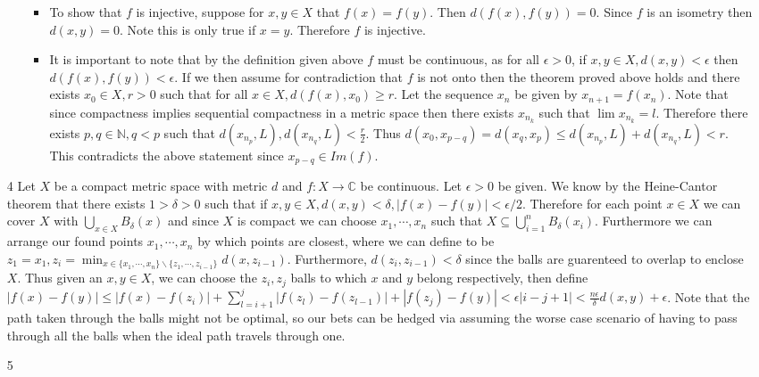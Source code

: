 \documentclass[12pt, letterpaper]{article}
\newcommand{\N}{\mathbb{N}}
\newcommand{\C}{\mathbb{C}}
\begin{document}
\begin{enumerate}
\begin{enumerate}
\begin{itemize}
			\item To show that $f$ is injective, suppose for $x,y \in X$ that 
			$f(x) = f(y)$.  Then $d(f(x),f(y)) = 0$.  Since $f$ is an isometry then
			$d(x,y) = 0$.  Note this is only true if $x = y$.  Therefore $f$ is 
			injective.
			\item It is important to note that by the definition given above $f$ must be 
			continuous, as for all $\epsilon > 0$, if $x,y \in X, d(x,y) < \epsilon$ 
			then $d(f(x),f(y)) < \epsilon$.  If we then assume for contradiction that 
			$f$ is not onto then the theorem proved above holds and there exists 
			$x_0 \in X, r > 0$ such that for all $x \in X, d(f(x), x_0) \geq r$.  Let the 
			sequence $x_n$ be given by $x_{n+1} = f(x_n)$.  Note that since compactness
			implies sequential compactness in a metric space then there exists $x_{n_k}$ 
			such that $\lim x_{n_k} = l$.  Therefore there exists $p,q\in \N, q < p$ such that 
			$d(x_{n_p}, L), d(x_{n_q}, L) < \frac{r}{2}$.  Thus $d(x_0, x_{p - q}) = d(x_q, x_p) \leq d(x_{n_p}, L) + d(x_{n_q}, L) < r$.  This contradicts the above statement since
			$x_{p-q} \in Im(f)$.  
		\end{itemize}
	\end{enumerate}
	\item[4] Let $X$ be a compact metric space with metric $d$ and $f: X \to \C$ be continuous. Let $\epsilon > 0$ be given. We know by the Heine-Cantor theorem that there exists $1 > \delta > 0$ such that if $x,y \in X, d(x,y) < \delta, |f(x) - f(y)| < \epsilon/2$.
	Therefore for each point $x \in X$ we can cover $X$ with $\bigcup_{x \in X} B_\delta(x)$
	and since $X$ is compact we can choose $x_1,\cdots,x_n$ such that $X \subseteq \bigcup_{i = 1}^n B_\delta(x_i)$.  Furthermore we can arrange our found points $x_1,\cdots, x_n$ by which points are closest, where we can define to be  $z_1 = x_1, z_i = \min_{x \in \{x_1,\cdots,x_n\}\backslash \{z_1,\cdots, z_{i-1}\}} d(x, z_{i-1})$.  Furthermore, $d(z_i,z_{i-1}) < \delta$ since the balls are guarenteed to overlap to enclose $X$.  Thus 
	given an $x,y \in X$, we can choose the $z_i, z_j$ balls to which $x$ and $y$ belong respectively, then define $|f(x) - f(y)| \leq |f(x) - f(z_i)| + \sum_{l = i + 1}^{j} |f(z_l) - f(z_{l-1})| + |f(z_j) - f(y)| < \epsilon |i - j + 1| < \frac{n\epsilon}{\delta}d(x,y) + \epsilon$.  Note that the path taken through the balls might not be optimal, so our bets 
	can be hedged via assuming the worse case scenario of having to pass through all the balls when the ideal path travels through one.  
	\item[5]

\end{enumerate}
\end{document}
